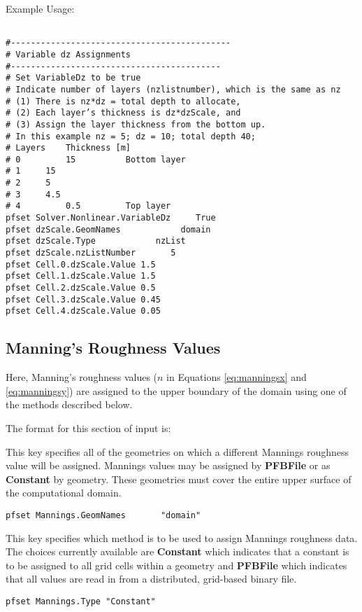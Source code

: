 Example Usage: 
\begin{display}\begin{verbatim}

#--------------------------------------------
# Variable dz Assignments
#------------------------------------------
# Set VariableDz to be true
# Indicate number of layers (nzlistnumber), which is the same as nz
# (1) There is nz*dz = total depth to allocate,  
# (2) Each layer’s thickness is dz*dzScale, and
# (3) Assign the layer thickness from the bottom up.
# In this example nz = 5; dz = 10; total depth 40;
# Layers 	Thickness [m]
# 0 		15 			Bottom layer
# 1		15
# 2		5
# 3		4.5			
# 4 		0.5			Top layer
pfset Solver.Nonlinear.VariableDz     True
pfset dzScale.GeomNames            domain
pfset dzScale.Type            nzList
pfset dzScale.nzListNumber       5
pfset Cell.0.dzScale.Value 1.5
pfset Cell.1.dzScale.Value 1.5
pfset Cell.2.dzScale.Value 0.5
pfset Cell.3.dzScale.Value 0.45
pfset Cell.4.dzScale.Value 0.05
\end{verbatim}\end{display}



\subsection{Manning's Roughness Values}
\label{Manning's Roughness Values}

Here, Manning's roughness values ($n$ in Equations \ref{eq:manningsx} and \ref{eq:manningsy}) are assigned to the upper boundary of the domain using one of the methods described below.

The format for this section of input is:

{
This key specifies all of the geometries on which a different Mannings roughness value will be 
assigned.  Mannings values may be assigned by {\bf PFBFile} or as {\bf Constant} by geometry.  These geometries must cover the entire upper surface of the computational domain.
}
\begin{display}\begin{verbatim}
pfset Mannings.GeomNames       "domain"
\end{verbatim}\end{display}

{
This key specifies which method is to be used to assign Mannings roughness data.  The choices currently
available are {\bf Constant} which indicates that a constant is to be
assigned to all grid cells within a geometry and {\bf PFBFile} which indicates that all values are read in from a distributed, grid-based \parflow{} binary file.
}
\begin{display}\begin{verbatim}
pfset Mannings.Type "Constant"
\end{verbatim}\end{display}

